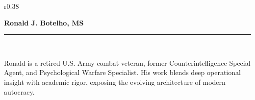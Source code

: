 \documentclass[12pt]{article}
\begin{document}
\begin{wrapfigure}{r}{0.38\textwidth}
    \vspace{-10pt}
    \hspace{10pt}
\end{wrapfigure}

\vspace*{1cm}

{\LARGE\textbf{Ronald J. Botelho, MS}} \\[0.5em]
\rule{0.9\linewidth}{0.5pt} \\[1em]

\begin{sloppypar}
Ronald is a retired U.S. Army combat veteran, former Counterintelligence
Special Agent, and Psychological Warfare Specialist. 
His work blends deep operational insight with academic rigor, 
exposing the evolving architecture of modern autocracy.
\end{sloppypar}
\end{document}
